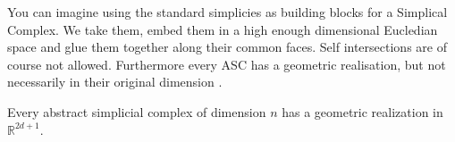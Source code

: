 You can imagine using the standard simplicies as building blocks for a Simplical Complex. We take them, embed them in a high enough dimensional Eucledian space and glue them together along their common faces. Self intersections are of course not allowed. Furthermore every ASC has a geometric realisation, but not necessarily in their original dimension \cite{comp-topo}.

\begin{thm} Every abstract simplicial complex of dimension $n$ has a geometric realization in $\mathbb{R}^{2d+1}$. \end{thm}












